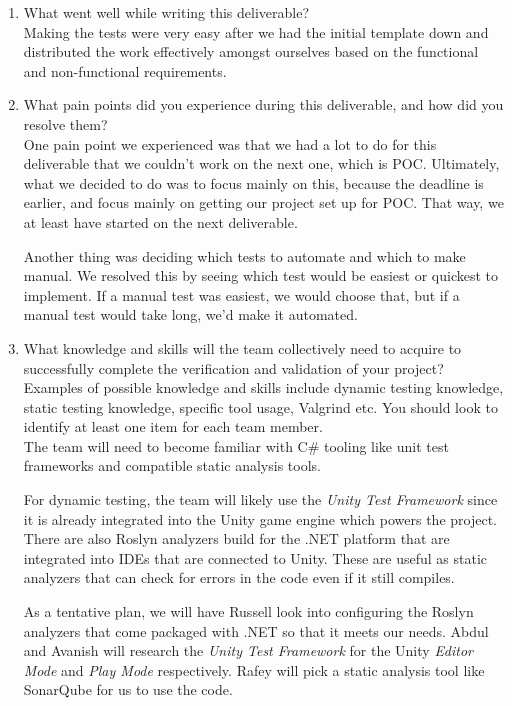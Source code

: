 \documentclass[12pt, titlepage]{article}
\begin{document}


\begin{enumerate}
  \item What went well while writing this deliverable? \\

  Making the tests were very easy after we had the initial template down and distributed the work effectively amongst ourselves based on the functional and non-functional requirements.

  \item What pain points did you experience during this deliverable, and how did you resolve them?\\

    One pain point we experienced was that we had a lot to do for this deliverable that we couldn't work on the next one, which is POC. Ultimately, what we decided to do was to focus mainly on this, because the deadline is earlier, and focus mainly on getting our project set up for POC. That way, we at least have started on the next deliverable.

    Another thing was deciding which tests to automate and which to make manual. We resolved this by seeing which test would be easiest or quickest to implement. If a manual test was easiest, we would choose that, but if a manual test would take long, we'd make it automated.\\

  \item What knowledge and skills will the team collectively need to acquire to successfully complete the verification and validation of your project? Examples of possible knowledge and skills include dynamic testing knowledge, static testing knowledge, specific tool usage, Valgrind etc. You should look to identify at least one item for each team member.\\

    The team will need to become familiar with C\# tooling like unit test frameworks and compatible static analysis tools.

    For dynamic testing, the team will likely use the \textit{Unity Test Framework} since it is already integrated into the Unity game engine which powers the project. There are also Roslyn analyzers build for the .NET platform that are integrated into IDEs that are connected to Unity. These are useful as static analyzers that can check for errors in the code even if it still compiles.

    As a tentative plan, we will have Russell look into configuring the Roslyn analyzers that come packaged with .NET so that it meets our needs. Abdul and Avanish will research the \textit{Unity Test Framework} for the Unity \textit{Editor Mode} and \textit{Play Mode} respectively. Rafey will pick a static analysis tool like SonarQube for us to use the code.


\end{enumerate}
\end{document}
